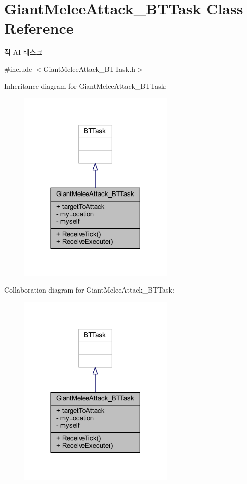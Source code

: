 \hypertarget{class_giant_melee_attack___b_t_task}{}\section{Giant\+Melee\+Attack\+\_\+\+B\+T\+Task Class Reference}
\label{class_giant_melee_attack___b_t_task}


적 AI 태스크  




{\ttfamily \#include $<$Giant\+Melee\+Attack\+\_\+\+B\+T\+Task.\+h$>$}



Inheritance diagram for Giant\+Melee\+Attack\+\_\+\+B\+T\+Task\+:
\nopagebreak
\begin{figure}[H]
\begin{center}
\leavevmode
\includegraphics[width=213pt]{class_giant_melee_attack___b_t_task__inherit__graph}
\end{center}
\end{figure}


Collaboration diagram for Giant\+Melee\+Attack\+\_\+\+B\+T\+Task\+:
\nopagebreak
\begin{figure}[H]
\begin{center}
\leavevmode
\includegraphics[width=213pt]{class_giant_melee_attack___b_t_task__coll__graph}
\end{center}
\end{figure}
